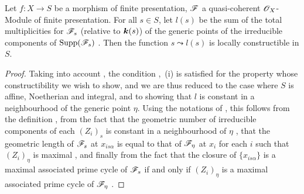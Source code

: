 \begin{proposition}[9.8.8]
\label{IV.9.8.8}
Let $f:X\to S$ be a morphism of finite presentation, $\mathscr{F}$ a quasi-coherent $\mathscr{O}_X$-Module of finite presentation.
For all $s\in S$, let $l(s)$ be the sum of the total multiplicities for $\mathscr{F}_s$ (relative to $\boldsymbol{k}(s)$) of the generic points of the irreducible components of $\operatorname{Supp}(\mathscr{F}_s)$ .
Then the function $s\leadsto l(s)$ is locally constructible in $S$.
\end{proposition}

\begin{proof}
\label{IV.9.8.8-proof}
Taking into account , the condition ,~(i) is satisfied for the property whose constructibility we wish to show, and we are thus reduced to the case where $S$ is affine, Noetherian and integral, and to showing that $l$ is constant in a neighbourhood of the generic point $\eta$.
Using the notations of , this follows from the definition , from the fact that the geometric number of irreducible components of each $(Z_i)_s$ is constant in a neighbourhood of $\eta$ , that the geometric length of $\mathscr{F}_s$ at $x_{is\alpha}$ is equal to that of $\mathscr{F}_\eta$ at $x_i$ for each $i$ such that $(Z_i)_\eta$ is maximal , and finally from the fact that the closure of $\{x_{is\alpha}\}$ is a maximal associated prime cycle of $\mathscr{F}_s$ if and only if $(Z_i)_\eta$ is a maximal associated prime cycle of $\mathscr{F}_\eta$ .
\end{proof}

